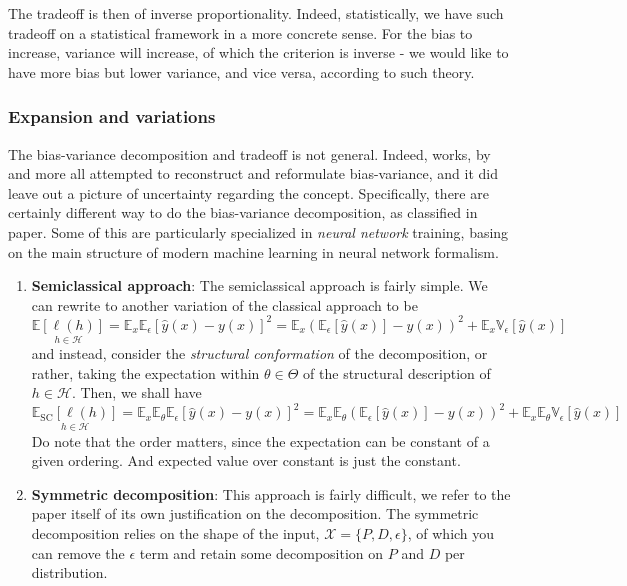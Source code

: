 \documentclass[10pt]{article} %
\begin{document}
The tradeoff is then of inverse proportionality. Indeed, statistically, we have such tradeoff on a statistical framework in a more concrete sense. For the bias to increase, variance will increase, of which the criterion is inverse - we would like to have more bias but lower variance, and vice versa, according to such theory.

\subsubsection{Expansion and variations}

The bias-variance decomposition and tradeoff is not general. Indeed, works, by \cite{6797087,sharma_bias-variance_2014,domingos_unifeid_2000,adlam2020understandingdoubledescentrequires,yang_rethinking_2020} and more all attempted to reconstruct and reformulate bias-variance, and it did leave out a picture of uncertainty regarding the concept. Specifically, there are certainly different way to do the bias-variance decomposition, as classified in \cite{adlam2020understandingdoubledescentrequires} paper. Some of this are particularly specialized in \textit{neural network} training, basing on the main structure of modern machine learning in neural network formalism. 
\begin{enumerate}[leftmargin=1cm,itemsep=2pt,topsep=1pt]
    \item \textbf{Semiclassical approach}: The semiclassical approach is fairly simple. We can rewrite to another variation of the classical approach to be \begin{equation}
        \underset{h\in\mathcal{H}}{\mathbb{E}[\ell(h)]} = \mathbb{E}_{x}\mathbb{E}_{\epsilon}\left[\hat{y}(x)-y(x)\right]^{2} = \mathbb{E}_{x}\left(\mathbb{E}_{\epsilon}[\hat{y}(x)]-y(x)\right)^{2} + \mathbb{E}_{x}\mathbb{V}_{\epsilon}\left[\hat{y}(x)\right]  
    \end{equation}
    and instead, consider the \textit{structural conformation} of the decomposition, or rather, taking the expectation within $\theta\in \Theta$ of the structural description of $h\in\mathcal{H}$. Then, we shall have 
    \begin{equation}
        \underset{h\in\mathcal{H}}{\mathbb{E}_{\mathrm{SC}}[\ell(h)]} = \mathbb{E}_{x}\mathbb{E}_{\theta}\mathbb{E}_{\epsilon}\left[\hat{y}(x)-y(x)\right]^{2} = \mathbb{E}_{x}\mathbb{E}_{\theta}\left(\mathbb{E}_{\epsilon}[\hat{y}(x)]-y(x)\right)^{2} + \mathbb{E}_{x}\mathbb{E}_{\theta}\mathbb{V}_{\epsilon}\left[\hat{y}(x)\right]
    \end{equation}
    Do note that the order matters, since the expectation can be constant of a given ordering. And expected value over constant is just the constant. 
    \item \textbf{Symmetric decomposition}: This approach is fairly difficult, we refer to the paper itself of its own justification on the decomposition. The symmetric decomposition relies on the shape of the input, $\mathcal{X}=\{P,D,\epsilon\}$, of which you can remove the $\epsilon$ term and retain some decomposition on $P$ and $D$ per distribution. 
\end{enumerate}
\end{document}
